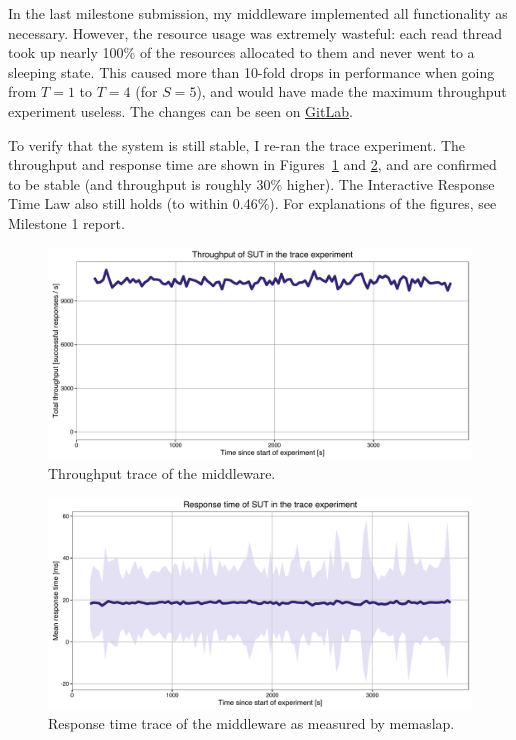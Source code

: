 \documentclass[11pt]{article}
\begin{document}
In the last milestone submission, my middleware implemented all functionality as necessary. However, the resource usage was extremely wasteful: each read thread took up nearly 100\% of the resources allocated to them and never went to a sleeping state. This caused more than 10-fold drops in performance when going from $T=1$ to $T=4$ (for $S=5$), and would have made the maximum throughput experiment useless. The changes can be seen on \href{https://gitlab.inf.ethz.ch/pungast/asl-fall16-project/commit/928e9bba132d34ecf9c00936babdd7fa2645e50f}{GitLab}.

To verify that the system is still stable, I re-ran the trace experiment. The throughput and response time are shown in Figures~\ref{fig:trace:throughput} and \ref{fig:trace:responsetime}, and are confirmed to be stable (and throughput is roughly 30\% higher). The Interactive Response Time Law also still holds (to within 0.46\%). For explanations of the figures, see Milestone 1 report.

\begin{figure}[h]
\centering
\includegraphics[width=\textwidth]{../results/trace_rep3/graphs/throughput.pdf}
\caption{Throughput trace of the middleware.}
\label{fig:trace:throughput}
\end{figure}

\begin{figure}[h]
\centering
\includegraphics[width=\textwidth]{../results/trace_rep3/graphs/responsetime.pdf}
\caption{Response time trace of the middleware as measured by memaslap.}
\label{fig:trace:responsetime}
\end{figure}
\end{document}
